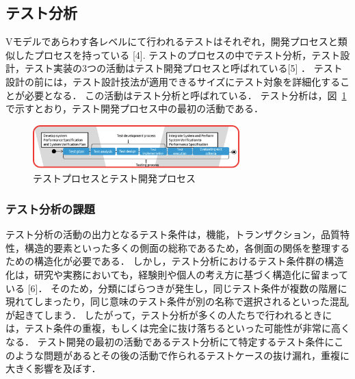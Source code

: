\documentclass[a4paper,10pt]{jreport}
\begin{document}
\subsection{テスト分析}
Vモデルであらわす各レベルにて行われるテストはそれぞれ，開発プロセスと類似したプロセスを持っている [4].
テストのプロセスの中でテスト分析，テスト設計，テスト実装の3つの活動はテスト開発プロセスと呼ばれている[5] ．
テスト設計の前には，テスト設計技法が適用できるサイズにテスト対象を詳細化することが必要となる．
この活動はテスト分析と呼ばれている．
テスト分析は，図~\ref{fig:D-2-Fig2}で示すとおり，テスト開発プロセス中の最初の活動である．
\begin{figure}[h]
  \begin{center}
   \includegraphics[width=8cm]{./image/D-2-Fig2.png}
   \caption{テストプロセスとテスト開発プロセス}
   \label{fig:D-2-Fig2}
  \end{center}
\end{figure}

\subsubsection{テスト分析の課題}
テスト分析の活動の出力となるテスト条件は，機能，トランザクション，品質特性，構造的要素といった多くの側面の総称であるため，各側面の関係を整理するための構造化が必要である．
しかし，テスト分析におけるテスト条件群の構造化は，研究や実務においても，経験則や個人の考え方に基づく構造化に留まっている [6]．
そのため，分類にばらつきが発生し，同じテスト条件が複数の階層に現れてしまったり，同じ意味のテスト条件が別の名称で選択されるといった混乱が起きてしまう．
したがって，テスト分析が多くの人たちで行われるときには，テスト条件の重複，もしくは完全に抜け落ちるといった可能性が非常に高くなる．
テスト開発の最初の活動であるテスト分析にて特定するテスト条件にこのような問題があるとその後の活動で作られるテストケースの抜け漏れ，重複に大きく影響を及ぼす．
\end{document}

